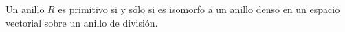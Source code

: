 %
%
%
%

\begin{theorem}
	\label{thm:densidad}
	Un anillo $R$ es primitivo si y sólo si es isomorfo a un anillo denso en un
	espacio vectorial sobre un anillo de división.
\end{theorem}

